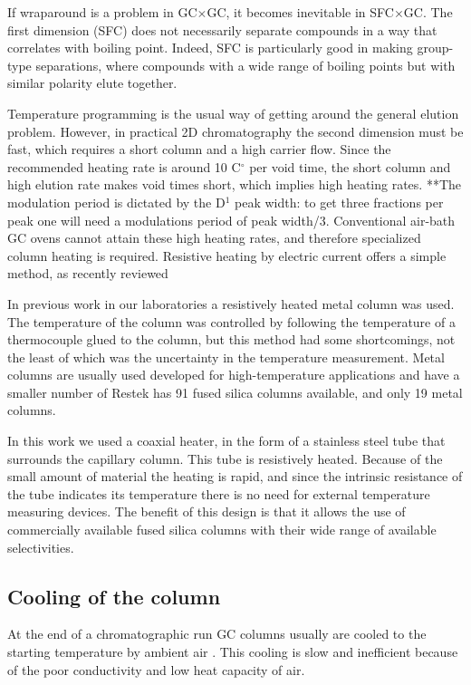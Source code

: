 \documentclass[aip,rsi,preprint,graphicx]{revtex4-1} %
\begin{document}
If wraparound is a problem in GC$\times$GC, it becomes inevitable in SFC$\times$GC. The first dimension (SFC) does not necessarily separate compounds in a way that correlates with boiling point. Indeed, SFC is particularly good in making group-type separations\cite{Venter1999}, where compounds with a wide range of boiling points but with similar polarity elute together. 

Temperature programming is the usual way of getting around the general elution problem. However, in practical 2D chromatography the second dimension must be fast, which requires a short column and a high carrier flow. Since the recommended heating rate is around 10 C$^\circ$ per void time\cite{Blumberg2000}, the short column and high elution rate makes void times short, which implies high heating rates. **The modulation period is dictated by the D$^1$ peak width: to get three fractions per peak one will need a modulations period of peak width/3. Conventional air-bath GC ovens cannot attain these high heating rates, and therefore specialized column heating is required. Resistive heating by electric current offers a simple method, as recently reviewed\cite{Wang2012} 

In previous work in our laboratories\cite{Venter2004,Venter2006} a resistively heated metal column was used. The temperature of the column was controlled by following the temperature of a thermocouple glued to the column, but this method had some shortcomings, not the least of which was the uncertainty in the temperature measurement. Metal columns are usually used developed for high-temperature applications and have a smaller number of Restek has 91 fused silica columns available, and only 19 metal columns. 

In this work we used a coaxial heater, in the form of a stainless steel tube that surrounds the capillary column.  This tube is resistively heated. Because of the small amount of material the heating is rapid, and since the intrinsic resistance of the tube indicates its temperature there is no need for external temperature measuring devices. The benefit of this design is that it allows the use of commercially available fused silica columns with their wide range of available selectivities.

\subsection{Cooling of the column}

At the end of a chromatographic run GC columns usually are cooled to the starting temperature by ambient air . This cooling is slow and inefficient because of the poor conductivity and low heat capacity of air. 
\end{document}
